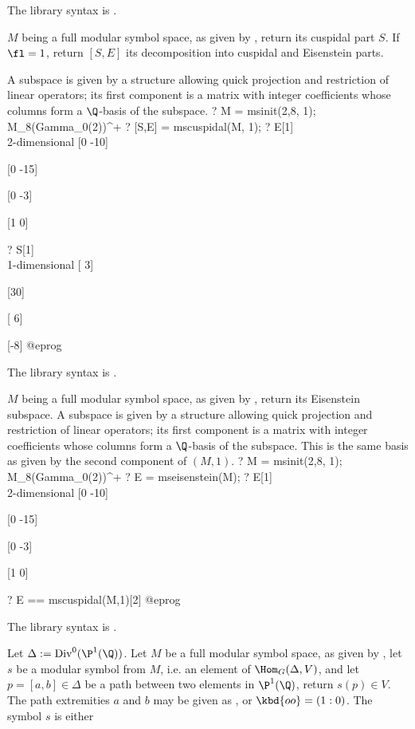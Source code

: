 The library syntax is .

\label{se:mscuspidal}
$M$ being a full modular symbol space, as given by ,
return its cuspidal part $S$. If $\fl = 1$, return
$[S,E]$ its decomposition into cuspidal and Eisenstein parts.

A subspace is given by a structure allowing quick projection and
restriction of linear operators; its first component is
a matrix with integer coefficients whose columns form a $\Q$-basis of
the subspace.
\bprog
? M = msinit(2,8, 1); \\ M_8(Gamma_0(2))^+
? [S,E] = mscuspidal(M, 1);
? E[1]  \\ 2-dimensional
[0 -10]

[0 -15]

[0  -3]

[1   0]

? S[1]  \\ 1-dimensional
[ 3]

[30]

[ 6]

[-8]
@eprog

The library syntax is .

\label{se:mseisenstein}
$M$ being a full modular symbol space, as given by ,
return its Eisenstein subspace.
A subspace is given by a structure allowing quick projection and
restriction of linear operators; its first component is
a matrix with integer coefficients whose columns form a $\Q$-basis of
the subspace.
This is the same basis as given by the second component of
$(M, 1)$.
\bprog
? M = msinit(2,8, 1); \\ M_8(Gamma_0(2))^+
? E = mseisenstein(M);
? E[1]  \\ 2-dimensional
[0 -10]

[0 -15]

[0  -3]

[1   0]

? E == mscuspidal(M,1)[2]
@eprog

The library syntax is .

\label{se:mseval}
Let $\Delta:=\text{Div}^0(\P^1 (\Q))$.
Let $M$ be a full modular symbol space, as given by ,
let $s$ be a modular symbol from $M$, i.e. an element
of $\Hom_G(\Delta, V)$, and let $p=[a,b] \in \Delta$ be a path between
two elements in $\P^1(\Q)$, return $s(p)\in V$. The path extremities $a$ and
$b$ may be given as ,  or $\kbd{oo} = (1:0)$.
The symbol $s$ is either


